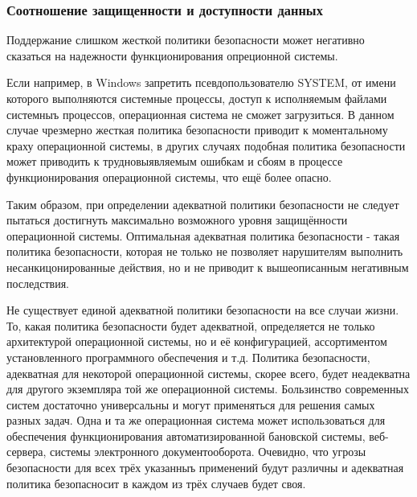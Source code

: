 \subsubsection{Соотношение защищенности и доступности данных}
Поддержание слишком жесткой политики безопасности может негативно
сказаться на надежности функционирования опреционной системы.

Если например, в Windows запретить псевдопользователю SYSTEM, от имени которого выполняются
системные процессы, доступ к исполняемым файлами системныъ процессов, операционная система не
сможет загрузиться. В данном случае чрезмерно жесткая политика безопасности приводит к
моментальному краху операционной системы, в других случаях подобная политика безопасности может
приводить к трудновыявляемым ошибкам и сбоям в процессе функционирования операционной системы,
что ещё более опасно.

Таким образом, при определении адекватной политики безопасности не следует пытаться достигнуть
максимально возможного уровня защищённости операционной системы. Оптимальная адекватная политика
безопасности - такая политика безопасности, которая не только не позволяет нарушителям выполнить
несанкицонированные действия, но и не приводит к вышеописанным негативным последствия.

Не существует единой адекватной политики безопасности на все случаи жизни. То, какая политика
безопасности будет адекватной, определяется не только архитектурой операционной системы, но и её
конфигурацией, ассортиментом установленного программного обеспечения и т.д. Политика безопасности,
адекватная для некоторой операционной системы, скорее всего, будет неадекватна для другого
экземпляра той же операционной системы. Бользинство современных систем достаточно универсальны и
могут применяться для решения самых разных задач. Одна и та же операционная система может
использоваться для обеспечения функционирования автоматизированной бановской системы, веб-сервера,
системы электронного документооборота. Очевидно, что угрозы безопасности для всех трёх указанныъ
применений будут различны и адекватная политика безопасносит в каждом из трёх случаев будет своя.

